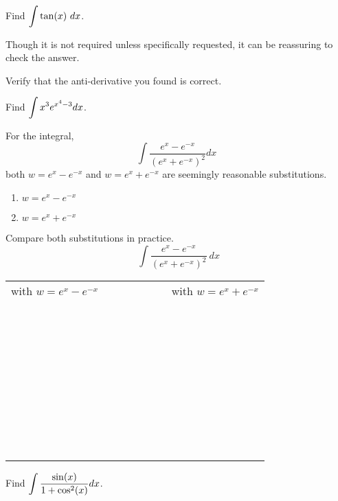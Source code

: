 \newpage


\problem Find $\displaystyle{ \int \tan(x) ~dx}$.

\vsc 

\vfill
\vfill
\vfill
\vfill

\newpage

Though it is not required unless specifically requested, it can be reassuring to check the answer.

\problem Verify that the anti-derivative you found is correct.

\vfill
\newpage

\problem Find $\displaystyle{\int x^3 e^{x^4 - 3} dx}$.

\newpage 
{}

\problem For the integral, $$ \int{\frac{e^x - e^{-x}}{(e^x + e^{-x})^2}}
  dx \ \ $$ both $w = e^{x} - e^{-x}$ and $w = e^{x} + e^{-x}$ are
  seemingly reasonable substitutions.  


  \begin{enumerate}[1.]
  \item  $ w = e^x - e^{-x}$ 
  \item  $ w = e^x + e^{-x}$ 
  \end{enumerate}

\newpage

\problem Compare both substitutions in practice.
$$ \int{\frac{e^x - e^{-x}}{(e^x + e^{-x})^2}}~dx$$
\begin{center}
\begin{tabular}{l|r}
   with $ w = e^x - e^{-x}$ ~~~~~ &~~~~~
   with $ w = e^x + e^{-x}$  \\
~& \\
~& \\
~& \\
~& \\
~& \\
~& \\
~& \\
~& \\
\end{tabular}
\end{center}

\newpage
{}
\problem Find $\displaystyle \int \frac{\sin(x)}{1 + \cos^2(x)} dx$.

\newpage



